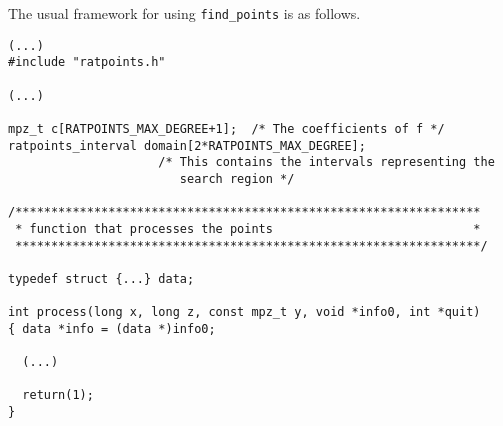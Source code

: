 \documentclass[12pt,a4paper,oneside]{amsart}
\begin{document}
The usual framework for using \texttt{find\_points} is as follows.

\begin{verbatim}
(...)
#include "ratpoints.h"

(...)

mpz_t c[RATPOINTS_MAX_DEGREE+1];  /* The coefficients of f */
ratpoints_interval domain[2*RATPOINTS_MAX_DEGREE];
                     /* This contains the intervals representing the
                        search region */

/*****************************************************************
 * function that processes the points                            *
 *****************************************************************/

typedef struct {...} data;

int process(long x, long z, const mpz_t y, void *info0, int *quit)
{ data *info = (data *)info0;

  (...)

  return(1);
}
\end{verbatim}
\end{document}
